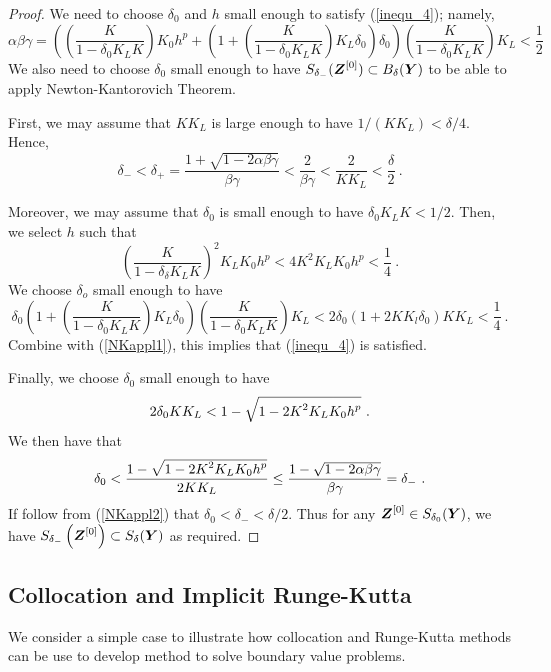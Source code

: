 \begin{proof}
We need to choose $\delta_0$ and $h$ small enough to satisfy
(\ref{inequ_4}); namely,
\[
\alpha\beta\gamma = \left( \left(\frac{K}{1-\delta_0 K_L K} \right) K_0 h^p
+ \left( 1 + \left(\frac{K}{1-\delta_0 K_L K}\right) K_L \delta_0
\right) \delta_0 \right) \left(\frac{K}{1-\delta_0 K_L K}\right) K_L
< \frac{1}{2}
\]
We also need to choose $\delta_0$ small enough to have
$\displaystyle S_{\delta_-}(\bm{Z}^{[0]}) \subset B_\delta(\bm{Y})$
to be able to apply Newton-Kantorovich Theorem.

First, we may assume that $K K_L$ is large enough to have
$1/(K K_L) < \delta/4$.  Hence,
\begin{equation} \label{NKappl2}
\delta_- < \delta_+ = \frac{1 + \sqrt{1 -2\alpha\beta\gamma}}{\beta\gamma}
< \frac{2}{\beta \gamma} < \frac{2}{K K_L} < \frac{\delta}{2} \ .
\end{equation}

Moreover, we may assume that $\delta_0$ is small enough to have
$\delta_0 K_L K < 1/2$.  Then, we select $h$ such that
\begin{equation} \label{NKappl1}
\left(\frac{K}{1-\delta_\delta K_L K} \right)^2 K_L K_0 h^p
< 4 K^2 K_L K_0 h^p < \frac{1}{4} \ .
\end{equation}
We choose $\delta_o$ small enough to have
\[
\delta_0 \left( 1 + \left(\frac{K}{1-\delta_0 K_L K}\right) K_L \delta_0
\right) \left(\frac{K}{1-\delta_0 K_L K}\right) K_L
< 2 \delta_0 \left( 1 + 2 K K_l\delta_0\right) K K_L
  < \frac{1}{4} \ .
\]
Combine with (\ref{NKappl1}), this implies that (\ref{inequ_4}) is
satisfied.

Finally, we choose $\delta_0$ small enough to have
\[
  2 \delta_0 K K_L < 1 - \sqrt{\displaystyle 1 - 2 K^2 K_L K_0 h^p} \ .
\]
We then have that
\[
\delta_0 < \frac{1 - \sqrt{\DS 1 - 2 K^2 K_L K_0 h^p}}{2 K K_L}
\leq \frac{1 - \sqrt{1 - 2\alpha\beta\gamma}}{\beta\gamma} = \delta_-\ .
\]
If follow from (\ref{NKappl2}) that $\delta_0 < \delta_- < \delta/2$.
Thus for any $\displaystyle \bm{Z}^{[0]} \in S_{\delta_0}(\bm{Y})$, we have
$\displaystyle S_{\delta_-}\left(\bm{Z}^{[0]}\right) \subset
S_\delta(\bm{Y})$ as required.
\end{proof}

\subsection{Collocation and Implicit Runge-Kutta}

We consider a simple case to illustrate how collocation and Runge-Kutta
methods can be use to develop method to solve boundary value problems.

